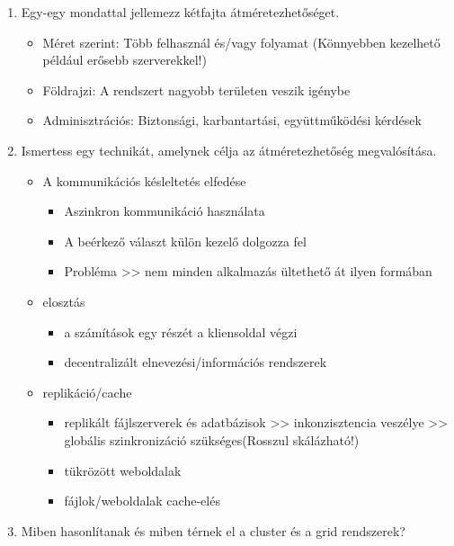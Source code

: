 \documentclass[twoside, a4paper, 12pt]{article}
\begin{document}
\begin{enumerate}
\begin{itemize}
        \end{itemize}
    \item Egy-egy mondattal jellemezz kétfajta átméretezhetőséget.
        \begin{itemize}
            \item Méret szerint: Több felhasznál és/vagy folyamat  (Könnyebben
                kezelhető például erősebb szerverekkel!)
            \item Földrajzi: A rendszert nagyobb területen veszik igénybe
            \item Adminisztrációs: Biztonsági, karbantartási, együttműködési kérdések
        \end{itemize}
    \item Ismertess egy technikát, amelynek célja az átméretezhetőség megvalósítása.
        \begin{itemize}
            \item A kommunikációs késleltetés elfedése
                \begin{itemize}
                    \item Aszinkron kommunikáció használata
                    \item A beérkező választ külön kezelő dolgozza fel
                    \item Probléma >> nem minden alkalmazás ültethető át ilyen formában
                \end{itemize}
            \item elosztás 
                \begin{itemize}
                    \item a számítások egy részét a kliensoldal végzi
                    \item decentralizált elnevezési/információs rendszerek
                \end{itemize}
            \item replikáció/cache
                \begin{itemize}
                    \item replikált fájlszerverek és adatbázisok >> inkonzisztencia veszélye >>
                        globális szinkronizáció szükséges(Rosszul skálázható!)
                    \item tükrözött weboldalak
                    \item fájlok/weboldalak cache-elés
                \end{itemize}
        \end{itemize}
    \item  Miben hasonlítanak és miben térnek el a cluster és a grid rendszerek?

\end{enumerate}
\end{document}
